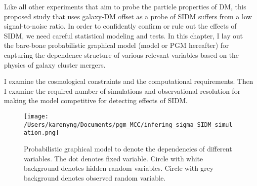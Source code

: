 \label{chapter3}

Like all other experiments that aim to probe the particle properties of
DM, this proposed study that uses galaxy-DM offset as a probe of SIDM suffers from a low signal-to-noise ratio. 
In order to confidently confirm or rule out the effects of SIDM, we need careful
statistical modeling and tests. 
In this chapter, I lay out the bare-bone probabilistic graphical model (model or PGM hereafter) for
capturing the dependence structure of various relevant variables based on the
physics of galaxy cluster mergers.  

I examine the cosmological constraints and the computational requirements.
Then I examine the required number of simulations and observational resolution for making
the model competitive for detecting effects of SIDM.\@ 
\begin{figure}
	\center
	\texttt{[image: /Users/karenyng/Documents/pgm\_MCC/infering\_sigma\_SIDM\_simulation.png]}
	\caption{Probabilistic graphical model to denote the dependencies of
		different variables. The dot denotes fixed variable. Circle with white
		background denotes hidden random variables. Circle with grey background
	denotes observed random variable.} 
\end{figure}

